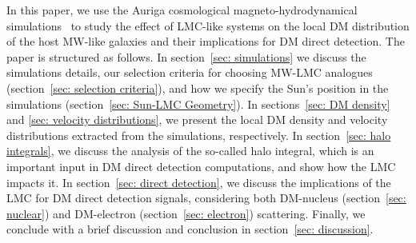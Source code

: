 In this paper, we use the Auriga cosmological magneto-hydrodynamical simulations~\cite{Grand:2016mgo} to study the effect of LMC-like systems on the local DM distribution of the host MW-like galaxies and their implications for DM direct detection.
The paper is structured as follows. In section~\ref{sec: simulations} we discuss the simulations details, our selection criteria for choosing MW-LMC analogues (section~\ref{sec: selection criteria}), and how we specify the Sun's position in the simulations (section~\ref{sec: Sun-LMC Geometry}). 
In sections~\ref{sec: DM density} and \ref{sec: velocity distributions}, we present the local DM density and velocity distributions extracted from the simulations, respectively. In section~\ref{sec: halo integrals}, we discuss the analysis of the so-called halo integral, which is an important input in DM direct detection computations, and show how the LMC impacts it. 
In section~\ref{sec: direct detection}, we discuss the implications of the LMC for DM direct detection signals, considering both DM-nucleus (section~\ref{sec: nuclear}) and DM-electron (section~\ref{sec: electron}) scattering. Finally, we conclude with a brief discussion and conclusion in section~\ref{sec: discussion}.

